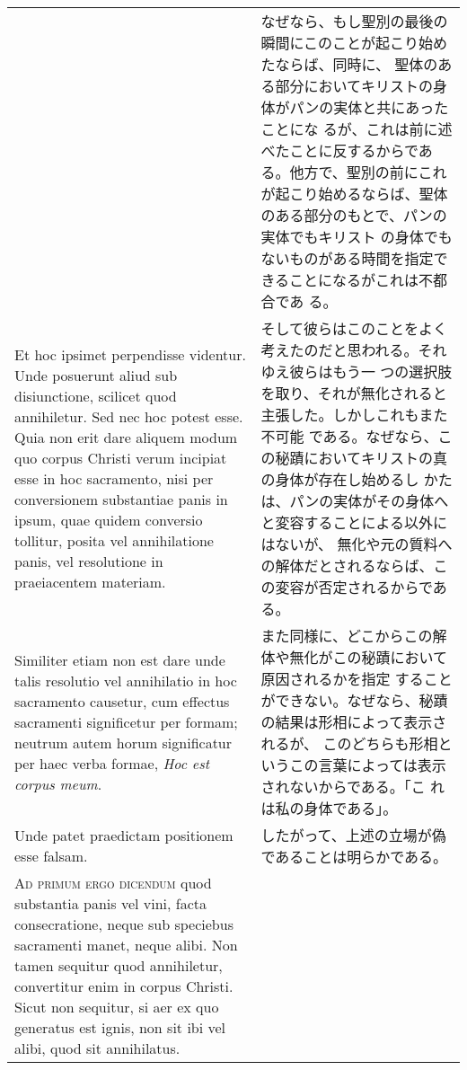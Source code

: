 \documentclass[10pt]{jsarticle} %
\begin{document}
\begin{longtable}{p{21em}p{21em}}
&

なぜなら、もし聖別の最後の瞬間にこのことが起こり始めたならば、同時に、
 聖体のある部分においてキリストの身体がパンの実体と共にあったことにな
 るが、これは前に述べたことに反するからである。他方で、聖別の前にこれ
 が起こり始めるならば、聖体のある部分のもとで、パンの実体でもキリスト
 の身体でもないものがある時間を指定できることになるがこれは不都合であ
 る。

\\




Et hoc ipsimet perpendisse videntur. Unde
posuerunt aliud sub disiunctione, scilicet quod annihiletur. Sed nec
hoc potest esse. Quia non erit dare aliquem modum quo corpus Christi
verum incipiat esse in hoc sacramento, nisi per conversionem
substantiae panis in ipsum, quae quidem conversio tollitur, posita vel
annihilatione panis, vel resolutione in praeiacentem
materiam. 


&

そして彼らはこのことをよく考えたのだと思われる。それゆえ彼らはもう一
 つの選択肢を取り、それが無化されると主張した。しかしこれもまた不可能
 である。なぜなら、この秘蹟においてキリストの真の身体が存在し始めるし
 かたは、パンの実体がその身体へと変容することによる以外にはないが、
 無化や元の質料への解体だとされるならば、この変容が否定されるからである。


\\

Similiter etiam non est dare unde talis resolutio vel
annihilatio in hoc sacramento causetur, cum effectus sacramenti
significetur per formam; neutrum autem horum significatur per haec
verba formae, {\itshape Hoc est corpus meum}. 


&

また同様に、どこからこの解体や無化がこの秘蹟において原因されるかを指定
 することができない。なぜなら、秘蹟の結果は形相によって表示されるが、
 このどちらも形相というこの言葉によっては表示されないからである。「こ
 れは私の身体である」。

\\



Unde patet praedictam positionem esse falsam.

&

したがって、上述の立場が偽であることは明らかである。

\\

{\scshape Ad primum ergo dicendum} quod substantia panis vel vini, facta
consecratione, neque sub speciebus sacramenti manet, neque alibi. Non
tamen sequitur quod annihiletur, convertitur enim in corpus
Christi. Sicut non sequitur, si aer ex quo generatus est ignis, non
sit ibi vel alibi, quod sit annihilatus.


\end{longtable}
\end{document}
